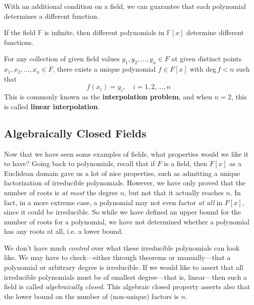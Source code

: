   With an additional condition on a field, we can guarantee that each polynomial determines a different function. 

  \begin{theorem}
    If the field $\mathbb{F}$ is infinite, then different polynomials in $\mathbb{F}[x]$ determine different functions. 
  \end{theorem}

  \begin{theorem}[Interpolation]
    For any collection of given field values $y_1, y_2, ..., y_n \in F$ at given distinct points $x_1, x_2, ..., x_n \in F$, there exists a unique polynomial $f \in F[x]$ with deg$\, f < n$ such that
    \begin{equation}
      f(x_i) = y_i, \quad i = 1, 2, ..., n
    \end{equation}
    This is commonly known as the \textbf{interpolation problem}, and when $n = 2$, this is called \textbf{linear interpolation}. 
  \end{theorem} 

\subsection{Algebraically Closed Fields} 

  Now that we have seen some examples of fields, what properties would we like it to have? Going back to polynomials, recall that if $F$ is a field, then $F[x]$ as a Euclidean domain gave us a lot of nice properties, such as admitting a unique factorization of irreducible polynomials. However, we have only proved that the number of roots is \textit{at most} the degree $n$, but not that it actually reaches $n$. In fact, in a more extreme case, a polynomial may not even factor \textit{at all} in $F[x]$, since it could be irreducible. So while we have defined an upper bound for the number of roots for a polynomial, we have not determined whether a polynomial has any roots at all, i.e. a lower bound. 

  We don't have much \textit{control} over what these irreducible polynomials can look like. We may have to check---either through theorems or manually---that a polynomial or arbitrary degree is irreducible. If we would like to assert that all irreducible polynomials must be of smallest degree---that is, linear---then such a field is called \textit{algebraically closed}. 
  This algebraic closed property asserts also that the lower bound on the number of (non-unique) factors is $n$. 

